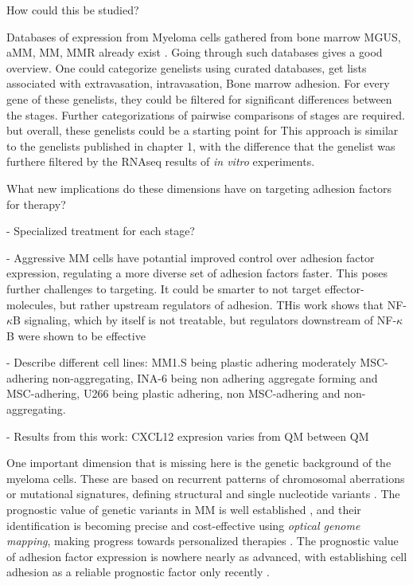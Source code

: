 How could this be studied?

Databases of expression from Myeloma cells gathered from bone
marrow \ac{MGUS}, \ac{aMM}, \ac{MM}, \ac{MMR} already exist
\citet{akhmetzyanovaDynamicCD138Surface2020,
      seckingerCD38ImmunotherapeuticTarget2018}. Going through such databases gives a
good overview. One could categorize genelists using curated databases, get lists
associated with extravasation, intravasation, Bone marrow adhesion. For every
gene of these genelists, they could be filtered for significant differences
between the stages. Further categorizations of pairwise comparisons of stages
are required. but overall, these genelists could be a starting point for This
approach is similar to the genelists published in chapter 1, with the difference
that the genelist was furthere filtered by the RNAseq results of \textit{in
      vitro} experiments.



What new implications do these dimensions have on targeting adhesion factors for
therapy?

- Specialized treatment for each stage?

- Aggressive MM cells have potantial improved control over adhesion factor
expression, regulating a more diverse set of adhesion factors faster. This poses
further challenges to targeting. It could be smarter to not target
effector-molecules, but rather upstream regulators of adhesion. THis work shows
that NF-$\kappa$B signaling, which by itself is not treatable, but regulators
downstream of NF-$\kappa$B were shown to be effective
\cite{adamikEZH2HDAC1Inhibition2017,adamikXRK3F2InhibitionP62ZZ2018}




\unnsubsection{\cadddiversitytitle}%
\label{sec:discussion_cadddiversity}%

- Describe different cell lines: MM1.S being plastic adhering moderately
MSC-adhering non-aggregating, INA-6 being non adhering aggregate forming and
MSC-adhering, U266 being plastic adhering, non MSC-adhering and
non-aggregating.

- Results from this work: CXCL12 expresion varies from QM between QM

One important dimension that is missing here is the genetic background of the
myeloma cells. These are based on recurrent patterns of chromosomal aberrations
or mutational signatures, defining structural and single nucleotide variants
\cite{kumarMultipleMyelomasCurrent2018a,
      hoangMutationalProcessesContributing2019}. The prognostic value of genetic
variants in MM is well established \cite{sharmaPrognosticRoleMYC2021}, and their
identification is becoming precise and cost-effective using \emph{optical
      genome mapping}, making progress towards personalized therapies
\cite{zouComprehensiveApproachEvaluate2024,
      budurleanIntegratingOpticalGenome2024}. The prognostic value of adhesion factor
expression is nowhere nearly as advanced, with establishing cell adhesion as a
reliable prognostic factor only recently
\cite{huDevelopmentCellAdhesionbased2024}.

